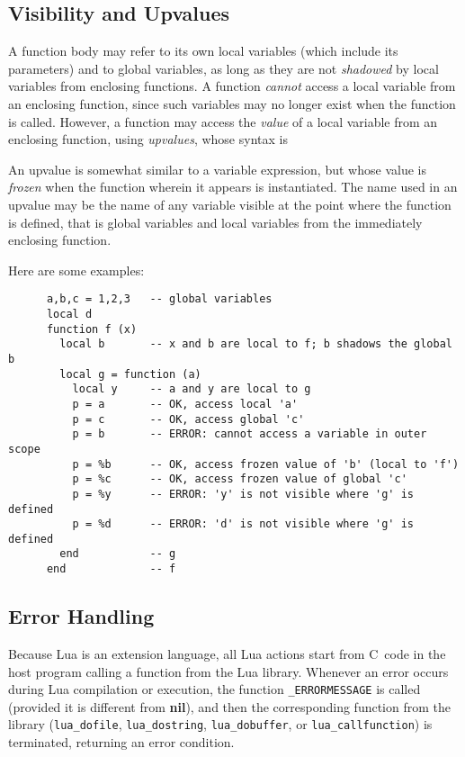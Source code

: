 \documentclass[11pt]{article}
\newcommand{\nil}{{\bf nil}}
\newcommand{\Deffunc}[1]{\index{#1}}
\renewcommand{\ter}[1]{{\rm`{\tt#1}'}}
\begin{document}
\subsection{Visibility and Upvalues} \label{upvalue}
 

A function body may refer to its own local variables
(which include its parameters) and to global variables,
as long as they are not \emph{shadowed} by local
variables from enclosing functions.
A function \emph{cannot} access a local
variable from an enclosing function,
since such variables may no longer exist when the function is called.
However, a function may access the \emph{value} of a local variable
from an enclosing function, using \emph{upvalues},
whose syntax is
\begin{Produc}
\produc{upvalue}{\ter{\%} name}
\end{Produc}%
An upvalue is somewhat similar to a variable expression,
but whose value is \emph{frozen} when the function wherein it
appears is instantiated.
The name used in an upvalue may be the name of any variable visible
at the point where the function is defined,
that is
global variables and local variables from the immediately enclosing function.

Here are some examples:
\begin{verbatim}
      a,b,c = 1,2,3   -- global variables
      local d
      function f (x)
        local b       -- x and b are local to f; b shadows the global b
        local g = function (a)
          local y     -- a and y are local to g
          p = a       -- OK, access local 'a'
          p = c       -- OK, access global 'c'
          p = b       -- ERROR: cannot access a variable in outer scope
          p = %b      -- OK, access frozen value of 'b' (local to 'f')
          p = %c      -- OK, access frozen value of global 'c'
          p = %y      -- ERROR: 'y' is not visible where 'g' is defined
          p = %d      -- ERROR: 'd' is not visible where 'g' is defined
        end           -- g
      end             -- f
\end{verbatim}


\subsection{Error Handling} \label{error}

Because Lua is an extension language,
all Lua actions start from C~code in the host program
calling a function from the Lua library.
Whenever an error occurs during Lua compilation or execution,
the function \verb|_ERRORMESSAGE| is called \Deffunc{_ERRORMESSAGE}
(provided it is different from \nil),
and then the corresponding function from the library
(\verb|lua_dofile|, \verb|lua_dostring|,
\verb|lua_dobuffer|, or \verb|lua_callfunction|)
is terminated, returning an error condition.
\end{document}
